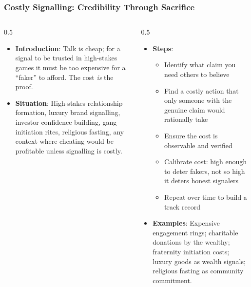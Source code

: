 \begin{frame}[fragile]\frametitle{Costly Signalling: Credibility Through Sacrifice}
\begin{columns}
    \begin{column}[T]{0.5\linewidth}
      \begin{itemize}
        \item \textbf{Introduction}: Talk is cheap; for a signal to be trusted in high-stakes games it must be too expensive for a ``faker'' to afford. The cost \textit{is} the proof.
        \item \textbf{Situation}: High-stakes relationship formation, luxury brand signalling, investor confidence building, gang initiation rites, religious fasting, any context where cheating would be profitable unless signalling is costly.
      \end{itemize}
    \end{column}
    \begin{column}[T]{0.5\linewidth}
      \begin{itemize}
        \item \textbf{Steps}:
        \begin{itemize}
          \item Identify what claim you need others to believe
          \item Find a costly action that only someone with the genuine claim would rationally take
          \item Ensure the cost is observable and verified
          \item Calibrate cost: high enough to deter fakers, not so high it deters honest signalers
          \item Repeat over time to build a track record
        \end{itemize}\item \textbf{Examples}: Expensive engagement rings; charitable donations by the wealthy; fraternity initiation costs; luxury goods as wealth signals; religious fasting as community commitment.
      \end{itemize}
    \end{column}
  \end{columns}
\end{frame}

